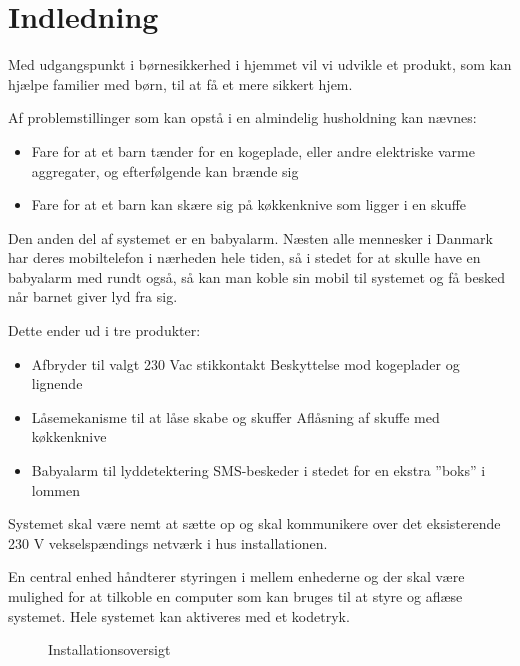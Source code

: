 \section{Indledning}

Med udgangspunkt i børnesikkerhed i hjemmet vil vi udvikle et produkt, som kan hjælpe familier med børn, til at få et mere sikkert hjem.

Af problemstillinger som kan opstå i en almindelig husholdning kan nævnes:
\begin{itemize}
	\item Fare for at et barn tænder for en kogeplade, eller andre elektriske varme aggregater, og efterfølgende kan brænde sig
	\item Fare for at et barn kan skære sig på køkkenknive som ligger i en skuffe
\end{itemize}

Den anden del af systemet er en babyalarm. Næsten alle mennesker i Danmark har deres mobiltelefon i nærheden hele tiden, så i stedet for at skulle have en babyalarm med rundt også, så kan man koble sin mobil til systemet og få besked når barnet giver lyd fra sig.

Dette ender ud i tre produkter:

\begin{itemize}
\item Afbryder til valgt 230 Vac stikkontakt
\subitem Beskyttelse mod kogeplader og lignende
\item Låsemekanisme til at låse skabe og skuffer
\subitem Aflåsning af skuffe med køkkenknive
\item Babyalarm til lyddetektering
\subitem SMS-beskeder i stedet for en ekstra ''boks'' i lommen
\end{itemize}

Systemet skal være nemt at sætte op og skal kommunikere over det eksisterende 230 V vekselspændings netværk i hus installationen.

En central enhed håndterer styringen i mellem enhederne og der skal være mulighed for at tilkoble en computer som kan bruges til at styre og aflæse systemet. Hele systemet kan aktiveres med et kodetryk.

\newpage

\begin{figure}[h] \centering
{}
\caption{Installationsoversigt}
\label{fig:installationsoversigt}
\end{figure}

